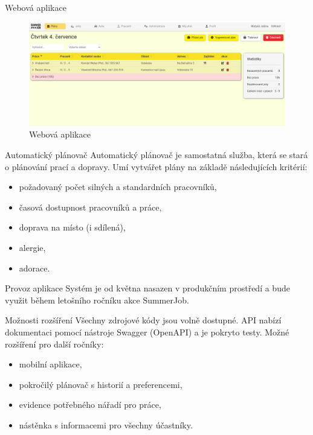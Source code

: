 \documentclass[czech,aspectratio=169]{beamer}
\begin{document}
  \begin{frame}{Webová aplikace}
    \begin{figure}
      \includegraphics[width=\textwidth]{webapp}
      \caption{Webová aplikace}
    \end{figure}
  \end{frame}

  \begin{frame}{Automatický plánovač}
    Automatický plánovač je samostatná služba, která se stará o plánování prací a dopravy. Umí vytvářet plány na základě následujících kritérií:
    \begin{itemize}
      \item<2-> požadovaný počet silných a standardních pracovníků,
      \item<3-> časová dostupnost pracovníků a práce,
      \item<4-> doprava na místo (i sdílená),
      \item<5-> alergie,
      \item<6-> adorace.
    \end{itemize}
  \end{frame}

  \begin{frame}{Provoz aplikace}
    Systém je od května nasazen v produkčním prostředí a bude využit během letošního ročníku akce SummerJob.
  \end{frame}

  \begin{frame}{Možnosti rozšíření}
    Všechny zdrojové kódy jsou volně dostupné. API nabízí dokumentaci pomocí nástroje Swagger (OpenAPI) a je pokryto testy.
    \linebreak
    \linebreak
    Možné rozšíření pro další ročníky:
    \begin{itemize}
      \item mobilní aplikace,
      \item pokročilý plánovač s historií a preferencemi,
      \item evidence potřebného nářadí pro práce,
      \item nástěnka s informacemi pro všechny účastníky.
    \end{itemize}
  \end{frame}
\end{document}
